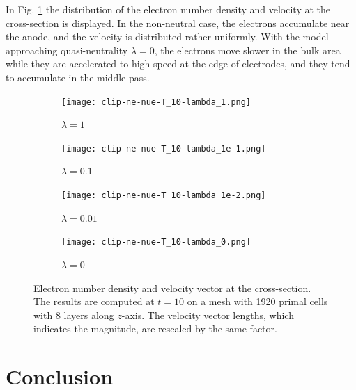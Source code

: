 \documentclass{article}
\newcommand{\todo}[1]{\textcolor{blue}{\fbox{\textbf{TODO: #1}}}}
\begin{document}
In Fig. \ref{fig:clip-ne-nue-T_10} the distribution of the electron number density and velocity at the cross-section is displayed. In the non-neutral case, the electrons accumulate near the anode, and the velocity is distributed rather uniformly. With the model approaching quasi-neutrality $\lambda = 0$, the electrons move slower in the bulk area while they are accelerated to high speed at the edge of electrodes, and they tend to accumulate in the middle pass.
\begin{figure}
    \centering
    \begin{subfigure}[b]{0.4\textwidth}
        \centering
        \texttt{[image: clip-ne-nue-T\_10-lambda\_1.png]}
        \caption{$\lambda = 1$}
    \end{subfigure}
    \begin{subfigure}[b]{0.4\textwidth}
        \centering
        \texttt{[image: clip-ne-nue-T\_10-lambda\_1e-1.png]}
        \caption{$\lambda = 0.1$}
    \end{subfigure}
    \begin{subfigure}[b]{0.4\textwidth}
        \centering
        \texttt{[image: clip-ne-nue-T\_10-lambda\_1e-2.png]}
        \caption{$\lambda = 0.01$}
    \end{subfigure}
    \hspace{0.2cm}
    \begin{subfigure}[b]{0.4\textwidth}
        \centering
        \texttt{[image: clip-ne-nue-T\_10-lambda\_0.png]}
        \caption{$\lambda = 0$}
    \end{subfigure}
    \caption{Electron number density and velocity vector at the cross-section. The results are computed at $t = 10$ on a mesh with 1920 primal cells with 8 layers along $z$-axis. The velocity vector lengths, which indicates the magnitude, are rescaled by the same factor.}
    \label{fig:clip-ne-nue-T_10}
\end{figure}

\section{Conclusion}
\todo{}
\end{document}
